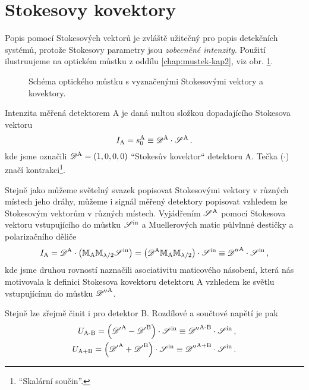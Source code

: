 \section{Stokesovy kovektory}
\label{app:kovektory}


Popis pomocí Stokesových vektorů je zvláště užitečný pro popis detekčních systémů, protože Stokesovy parametry jsou \emph{zobecněné intenzity}.
Použití ilustruujeme na optickém můstku z oddílu \ref{chap:mustek-kap2}, viz obr. \ref{fig:mustek-dodatek}.

\begin{figure}[htbp]
    \centering
    \caption{Schéma optického můstku s vyznačenými Stokesovými vektory a kovektory.}
    \label{fig:mustek-dodatek}
\end{figure}

Intenzita měřená detektorem A je daná nultou složkou dopadajícího Stokesova vektoru
\begin{equation}
    I_\textrm{A}=s_0^\textrm{A} \equiv \mathscr{D}^\textrm{A} \cdot \mathscr{S}^\textrm{A} \,.
\end{equation}
kde jsme označili $\mathscr{D}^\textrm{A}=(1, 0, 0, 0)$ ``Stokesův kovektor`` detektoru A. 
Tečka ($\cdot$) značí kontrakci\footnote{``Skalární součin''.}.

Stejně jako můžeme světelný svazek popisovat Stokesovými vektory v různých místech jeho dráhy, můžeme i signál měřený detektory popisovat vzhledem ke Stokesovým vektorům v různých místech.
Vyjádřením $\mathscr{S}^\textrm{A}$ pomocí Stokesova vektoru vstupujícího do můstku $\mathscr{S}^\textrm{in}$ a Muellerových matic půlvlnné destičky a polarizačního děliče
\begin{equation}
    I_\textrm{A}= \mathscr{D}^\textrm{A} \cdot \left( \mathbb{M}_\textrm{A} \mathbb{M}_{\lambda/2} \mathscr{S}^\textrm{in} \right) = \left( \mathscr{D}^\textrm{A} \mathbb{M}_\textrm{A} \mathbb{M}_{\lambda/2}\right) \cdot \mathscr{S}^\textrm{in} \equiv {\mathscr{D}''}^\textrm{A} \cdot \mathscr{S}^\textrm{in}  \,,
\end{equation}
kde jsme druhou rovností naznačili asociativitu maticového násobení, která nás motivovala k definici Stokesova kovektoru detektoru A vzhledem ke světlu vstupujícímu do můstku ${\mathscr{D}''}^\textrm{A}$.

Stejně lze zřejmě činit i pro detektor B.
Rozdílové a součtové napětí je pak
\begin{align}
\label{eqn:af}
U_\textrm{A-B} = \left( {\mathscr{D}'}^\textrm{A}-{\mathscr{D}'}^\textrm{B}\right) \cdot \mathscr{S}^\textrm{in} \equiv {\mathscr{D}''}^\textrm{A-B}\cdot \mathscr{S}^\textrm{in} \,, \\
U_\textrm{A+B} = \left({\mathscr{D}'}^\textrm{A}+{\mathscr{D}'}^\textrm{B}\right) \cdot \mathscr{S}^\textrm{in} \equiv {\mathscr{D}''}^\textrm{A+B}\cdot \mathscr{S}^\textrm{in} \,.
\end{align}

